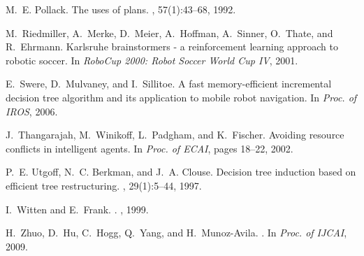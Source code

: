 \documentclass{aamas2010}
\begin{document}
\begin{thebibliography}{10}
M.~E. Pollack.
\newblock The uses of plans.
, 57(1):43--68, 1992.

M.~Riedmiller, A.~Merke, D.~Meier, A.~Hoffman, A.~Sinner, O.~Thate, and
  R.~Ehrmann.
\newblock Karlsruhe brainstormers - a reinforcement learning approach to
  robotic soccer.
\newblock In {\em {RoboCup} 2000: Robot Soccer World Cup {IV}}, 2001.

E.~Swere, D.~Mulvaney, and I.~Sillitoe.
\newblock A fast memory-efficient incremental decision tree algorithm and its
  application to mobile robot navigation.
\newblock In {\em Proc. of IROS}, 2006.

J.~Thangarajah, M.~Winikoff, L.~Padgham, and K.~Fischer.
\newblock Avoiding resource conflicts in intelligent agents.
\newblock In {\em Proc. of ECAI}, pages 18--22, 2002.

P.~E. Utgoff, N.~C. Berkman, and J.~A. Clouse.
\newblock Decision tree induction based on efficient tree restructuring.
, 29(1):5--44, 1997.

I.~Witten and E.~Frank.
.
, 1999.

H.~Zhuo, D.~Hu, C.~Hogg, Q.~Yang, and H.~Munoz-Avila.
.
\newblock In {\em Proc. of IJCAI}, 2009.

\end{thebibliography}




%
%

\end{document}
